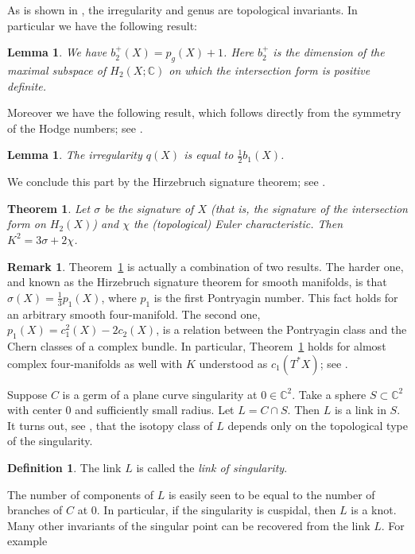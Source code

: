 \documentclass[11pt]{amsart}
\numberwithin{equation}{section}
\theoremstyle{plain}
\newtheorem{theorem}[equation]{Theorem}
\newtheorem{lemma}[equation]{Lemma}
\theoremstyle{definition}
\newtheorem{remark}[equation]{Remark}
\newtheorem{definition}[equation]{Definition}
\begin{document}
As is shown in \cite[Section IV.2]{BH}, the irregularity and genus are topological invariants. In particular we have the following result:
\begin{lemma}\label{lem:sig}
We have $b_2^+(X)=p_g(X)+1$. Here $b_2^+$ is the dimension of the maximal subspace of $H_2(X;{\mathbb C})$ on which the intersection form is
positive definite.
\end{lemma}
Moreover we have the following result, which follows directly from the symmetry of the Hodge numbers; see  \cite[Section IV.2]{BH}.
\begin{lemma}\label{lem:irr}
The irregularity $q(X)$ is equal to $\frac12b_1(X)$.
\end{lemma}
We conclude this part by the Hirzebruch signature theorem; see \cite[Theorem I.3.1]{BH}.
\begin{theorem}\label{thm:hirz}
Let $\sigma$ be the signature of $X$ (that is, the signature of the intersection form on $H_2(X)$) and $\chi$ the (topological) Euler
characteristic. Then $K^2=3\sigma+2\chi$.
\end{theorem}
\begin{remark}\label{rem:hirz}
Theorem~\ref{thm:hirz} is actually a combination of two results. The harder one, and known as the Hirzebruch signature theorem for smooth manifolds, 
is that $\sigma(X)=\frac13p_1(X)$, where $p_1$ is the first Pontryagin number. This fact holds for an arbitrary smooth
four-manifold. The second one,  $p_1(X)=c_1^2(X)-2c_2(X)$, is a relation between the Pontryagin class and the Chern classes of a
complex bundle. In particular, Theorem~\ref{thm:hirz} holds for almost complex four-manifolds as well with $K$ understood as  $c_1(T^*X)$; see 
\cite[Section I.4]{GS}.

\end{remark}
\smallskip
Suppose $C$ is a germ of a plane curve singularity at $0\in{\mathbb C}^2$. Take a sphere $S\subset{\mathbb C}^2$ with center $0$
and sufficiently small radius. Let $L=C\cap S$. Then $L$ is a link in $S$.
It turns out, see \cite[Appendix to Chapter I]{EN}, that the isotopy class of $L$ depends only on the topological type of the singularity.
\begin{definition}
The link $L$ is called the \emph{link of singularity}.
\end{definition}
The number of components of $L$ is easily seen to be equal to the number of branches of $C$ at $0$. In particular, if the singularity
is cuspidal, then $L$ is a knot. Many other invariants of the singular point can be recovered from the link $L$. For example
\end{document}

